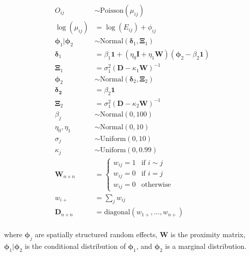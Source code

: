 \documentclass[10pt,letterpaper]{article}
\begin{document}
\begin{align*}
O_{ij}                 &\sim   \mbox{Poisson}(\mu_{ij})\\
\log(\mu_{ij})         &=      \log(E_{ij}) + \phi_{ij}\\
\boldsymbol{\phi}_{1}|\boldsymbol{\phi}_{2} &\sim \mbox{Normal}(\boldsymbol{\delta}_{1},\boldsymbol{\Xi}_{1})\\
\boldsymbol{\delta}_{1} &= \beta_{1}\boldsymbol{1} + (\eta_{0} \mathbf{I} + \eta_{1} \boldsymbol{W}) (\boldsymbol{\phi}_{2} - \beta_{2}\boldsymbol{1})\\
\boldsymbol{\Xi}_{1}    &= \sigma_{1}^{2}(\boldsymbol{D} -\kappa_{1}\boldsymbol{W} )^{-1} \\
\boldsymbol{\phi}_{2}   &\sim \mbox{Normal}(\boldsymbol{\delta}_{2},\boldsymbol{\Xi}_{2})\\
\boldsymbol{\delta_{2}} &= \beta_{2}\mathbf{1}\\
\boldsymbol{\Xi}_{2}    &= \sigma_{1}^{2}(\boldsymbol{D} -\kappa_{2}\boldsymbol{W})^{-1} \\
\beta_{j}               &\sim \mbox{Normal}(0,100)\\
\eta_{0},\eta_{1}       &\sim \mbox{Normal}(0,10)\\
\sigma_{j}              &\sim \mbox{Uniform}(0,10)\\
\kappa_{j}              &\sim \mbox{Uniform}(0,0.99)\\
\boldsymbol{W}_{n \times n} &=
\left\{
\begin{array}{rl}
w_{ij} = 1 & \mbox{if } i \sim j \\
w_{ij} = 0 & \mbox{if } i = j    \\
w_{ij} = 0 & \mbox{otherwise}   
\end{array}
\right.\\
w_{i+}                      &=\sum_{j} w_{ij}\\
\boldsymbol{D}_{n \times n} &=\mbox{diagonal}(w_{1+},\dots,w_{n+})\\
\end{align*}

where $\boldsymbol{\phi}_{j}$ are spatially structured random effects, $\boldsymbol{W}$ is the proximity matrix,
$\boldsymbol{\phi}_{1}|\boldsymbol{\phi}_{2}$ is the conditional distribution of $\boldsymbol{\phi}_{1}$, and $\boldsymbol{\phi}_{2}$ is a marginal distribution. 

\newpage
\end{document}
